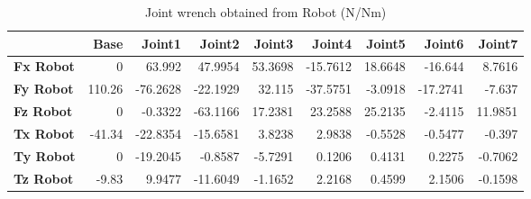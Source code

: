 \begin{table}[h!]
	\centering
	\caption{Joint wrench obtained from Robot (N/Nm)}
	\label{wrech_Robot_Pose6}
	\begin{tabular}{|l|r|r|r|r|r|r|r|r|}
		\hline
		\textbf{} & \textbf{Base} & \textbf{Joint1}  & \textbf{Joint2}  & \textbf{Joint3}  & \textbf{Joint4}  & \textbf{Joint5}  & \textbf{Joint6}  & \textbf{Joint7} \\ \hline
		\textbf{Fx Robot}  & 0        & 63.992        & 47.9954        & 53.3698        & -15.7612        & 18.6648        & -16.644        & 8.7616 \\ \hline
		\textbf{Fy Robot}  & 110.26        & -76.2628        & -22.1929        & 32.115        & -37.5751        & -3.0918        & -17.2741        & -7.637 \\ \hline
		\textbf{Fz Robot}  & 0        & -0.3322        & -63.1166        & 17.2381        & 23.2588        & 25.2135        & -2.4115        & 11.9851 \\ \hline
		\textbf{Tx Robot}  & -41.34        & -22.8354        & -15.6581        & 3.8238        & 2.9838        & -0.5528        & -0.5477        & -0.397 \\ \hline
		\textbf{Ty Robot}  & 0        & -19.2045        & -0.8587        & -5.7291        & 0.1206        & 0.4131        & 0.2275        & -0.7062 \\ \hline
		\textbf{Tz Robot}  & -9.83        & 9.9477        & -11.6049        & -1.1652        & 2.2168        & 0.4599        & 2.1506        & -0.1598 \\ \hline
	\end{tabular}
\end{table}

